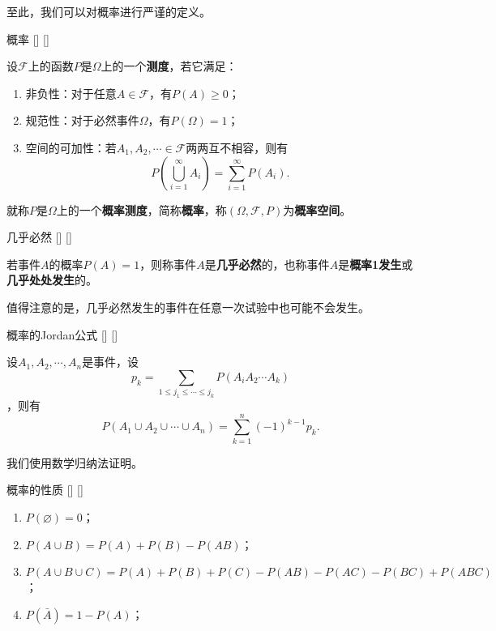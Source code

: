 \documentclass[UTF8]{ctexart}
\begin{document}
        至此，我们可以对概率进行严谨的定义。

        \begin{dfn}
            []
            {概率}
            []
            []


            设$\mathcal{F}$上的函数$P$是$\Omega$上的一个\textbf{测度}，若它满足：

            \begin{enumerate}
                \item 非负性：对于任意$A\in\mathcal{F}$，有$P(A)\geq 0$；
                \item 规范性：对于必然事件$\Omega$，有$P(\Omega)=1$；
                \item 空间的可加性：若$A_1,A_2,\cdots\in\mathcal{F}$两两互不相容，则有\[P\left(\bigcup_{i=1}^{\infty}A_i\right)=\sum_{i=1}^{\infty}P(A_i).\]
            \end{enumerate}
            就称$P$是$\Omega$上的一个\textbf{概率测度}，简称\textbf{概率}，称$(\Omega,\mathcal{F},P)$为\textbf{概率空间}。
        \end{dfn}

        \begin{dfn}
            []
            {几乎必然}
            []
            []


            若事件$A$的概率$P(A)=1$，则称事件$A$是\textbf{几乎必然}的，也称事件$A$是\textbf{概率1发生}或\textbf{几乎处处发生}的。

            值得注意的是，几乎必然发生的事件在任意一次试验中也可能不会发生。
        \end{dfn}

        \begin{thm}
            []
            {概率的Jordan公式}
            []
            []


            设$A_1,A_2,\cdots,A_n$是事件，设\[p_k=\sum_{1\leq j_1\leq\cdots\leq j_k  }P(A_iA_2\cdots A_k)\]，则有
            \[P(A_1\cup A_2\cup\cdots\cup A_n)=\sum_{k=1}^{n}(-1)^{k-1}p_k.\]
        \end{thm}

        \begin{prf}
            
            
            
            
            我们使用数学归纳法证明。


        \end{prf}

        \begin{ppt}
            []
            {概率的性质}
            []
            []


            \begin{enumerate}
                \item $P(\varnothing)=0$；
                \item $P(A\cup B)=P(A)+P(B)-P(AB)$；
                \item $P(A\cup B\cup C)=P(A)+P(B)+P(C)-P(AB)-P(AC)-P(BC)+P(ABC)$；
                \item $P(\bar{A})=1-P(A)$；
            \end{enumerate}
        \end{ppt}
\end{document}
